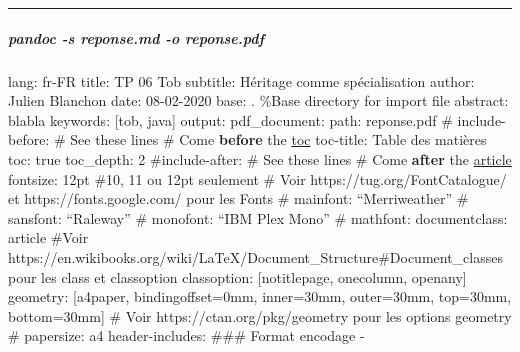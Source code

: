 \documentclass[
]{article}
\author{}
\date{}
\begin{document}
\begin{center}\rule{0.5\linewidth}{0.5pt}\end{center}

\hypertarget{pandoc--s-reponse.md--o-reponse.pdf}{%
\subparagraph{pandoc -s reponse.md -o
reponse.pdf}\label{pandoc--s-reponse.md--o-reponse.pdf}}

lang: fr-FR title: TP 06 Tob subtitle: Héritage comme spécialisation
author: Julien Blanchon date: 08-02-2020 base: . \%Base directory for
import file abstract: blabla keywords: {[}tob, java{]} output:
pdf\_document: path: reponse.pdf \# include-before: \textbar{} \# See
these lines \# Come \textbf{before} the \href{/dev/null}{toc} toc-title:
Table des matières toc: true toc\_depth: 2 \#include-after: \textbar{}
\# See these lines \# Come \textbf{after} the \href{/dev/null}{article}
fontsize: 12pt \#10, 11 ou 12pt seulement \# Voir
https://tug.org/FontCatalogue/ et https://fonts.google.com/ pour les
Fonts \# mainfont: ``Merriweather'' \# sansfont: ``Raleway'' \#
monofont: ``IBM Plex Mono'' \# mathfont: documentclass: article \#Voir
https://en.wikibooks.org/wiki/LaTeX/Document\_Structure\#Document\_classes
pour les class et classoption classoption: {[}notitlepage, onecolumn,
openany{]} geometry: {[}a4paper, bindingoffset=0mm, inner=30mm,
outer=30mm, top=30mm, bottom=30mm{]} \# Voir
https://ctan.org/pkg/geometry pour les options geometry \# papersize: a4
header-includes: \#\#\# Format encodage -

\usepackage[utf8]{inputenc}
\end{document}
